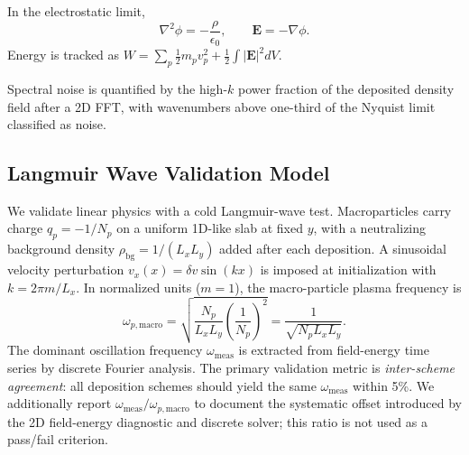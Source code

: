 In the electrostatic limit,
\begin{equation}
    \nabla^2 \phi = -\frac{\rho}{\epsilon_0}, \qquad \mathbf{E} = -\nabla \phi.
\end{equation}
Energy is tracked as $W = \sum_p \frac{1}{2} m_p v_p^2 + \frac{1}{2}\int |\mathbf{E}|^2 dV$.

Spectral noise is quantified by the high-$k$ power fraction of the deposited density field after a 2D FFT, with wavenumbers above one-third of the Nyquist limit classified as noise.

\subsection{Langmuir Wave Validation Model}
We validate linear physics with a cold Langmuir-wave test.
Macroparticles carry charge $q_p = -1/N_p$ on a uniform 1D-like slab at fixed $y$, with a neutralizing background density $\rho_{\mathrm{bg}} = 1/(L_x L_y)$ added after each deposition.
A sinusoidal velocity perturbation $v_x(x) = \delta v \sin(kx)$ is imposed at initialization with $k = 2\pi m / L_x$.
In normalized units ($m=1$), the macro-particle plasma frequency is
\begin{equation}
    \omega_{p,\mathrm{macro}} = \sqrt{\frac{N_p}{L_x L_y}\left(\frac{1}{N_p}\right)^2} = \frac{1}{\sqrt{N_p L_x L_y}}.
\end{equation}
The dominant oscillation frequency $\omega_{\mathrm{meas}}$ is extracted from field-energy time series by discrete Fourier analysis.
The primary validation metric is \emph{inter-scheme agreement}: all deposition schemes should yield the same $\omega_{\mathrm{meas}}$ within 5\%.
We additionally report $\omega_{\mathrm{meas}}/\omega_{p,\mathrm{macro}}$ to document the systematic offset introduced by the 2D field-energy diagnostic and discrete solver; this ratio is not used as a pass/fail criterion.
